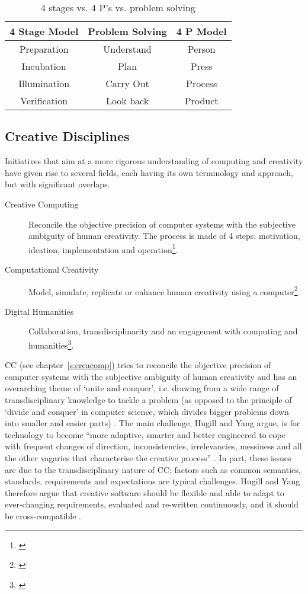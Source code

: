 \begin{table}[!htbp]
\caption[4 stages vs. 4 P's vs. problem solving]{4 stages vs. 4 P's vs. problem solving}
\label{tab:4SPPS}
\centering
\begin{tabu}{ccc}
\toprule
\textbf{4 Stage Model} & \textbf{Problem Solving} & \textbf{4 P Model} \\
\midrule
Preparation & Understand & Person \\
Incubation & Plan & Press \\
Illumination & Carry Out & Process \\
Verification & Look back & Product \\
\bottomrule
\end{tabu}
\end{table}


\subsection{Creative Disciplines}
\label{s:creatdisc}

Initiatives that aim at a more rigorous understanding of computing and creativity have given rise to several fields, each having its own terminology and approach, but with significant overlaps.

\begin{description}
  \item [Creative Computing] Reconcile the objective precision of computer systems with the subjective ambiguity of human creativity. The process is made of 4 steps: motivation, ideation, implementation and operation\footnote{\autocite{Hugill2013c}}.
  \item [Computational Creativity] Model, simulate, replicate or enhance human creativity using a computer\footnote{\autocite{Colton2012}}.
  \item [Digital Humanities] Collaboration, transdisciplinarity and an engagement with computing and humanities\footnote{\autocite{Burdick2012}}.
\end{description}

\acf{CC} (see chapter~\ref{s:creacomp}) tries to reconcile the objective precision of computer systems with the subjective ambiguity of human creativity \autocite{Hugill2013c} and has an overarching theme of `unite and conquer', i.e. drawing from a wide range of transdisciplinary knowledge to tackle a problem (as opposed to the principle of `divide and conquer' in computer science, which divides bigger problems down into smaller and easier parts) \autocite{Yang2013}. The main challenge, Hugill and Yang argue, is for technology to become ``more adaptive, smarter and better engineered to cope with frequent changes of direction, inconsistencies, irrelevancies, messiness and all the other vagaries that characterise the creative process'' \autocite*{Hugill2013c}. In part, these issues are due to the transdisciplinary nature of \ac{CC}; factors such as common semantics, standards, requirements and expectations are typical challenges. Hugill and Yang therefore argue that creative software should be flexible and able to adapt to ever-changing requirements, evaluated and re-written continuously, and it should be cross-compatible \autocite*{Hugill2013c}.


